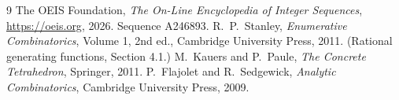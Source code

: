 \documentclass[11pt,a4paper]{article}
\theoremstyle{plain}
\theoremstyle{definition}
\begin{document}
\begin{thebibliography}{9}
 The OEIS Foundation, \emph{The On-Line Encyclopedia of Integer
Sequences}, \url{https://oeis.org}, 2026. Sequence A246893.
 R.~P.~Stanley, \emph{Enumerative Combinatorics}, Volume 1, 2nd ed.,
Cambridge University Press, 2011. (Rational generating functions, Section 4.1.)
 M.~Kauers and P.~Paule, \emph{The Concrete Tetrahedron}, Springer, 2011.
 P.~Flajolet and R.~Sedgewick, \emph{Analytic Combinatorics}, Cambridge
University Press, 2009.
\end{thebibliography}
\end{document}
